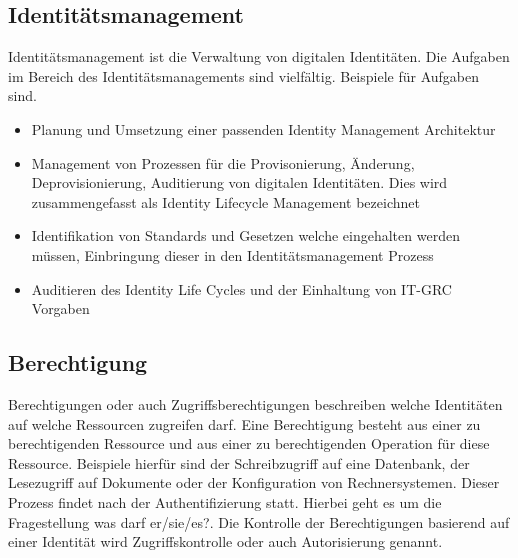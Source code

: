 \documentclass[11pt]{article}
\begin{document}
\subsection{Identitätsmanagement}
Identitätsmanagement ist die Verwaltung von digitalen Identitäten. Die Aufgaben im Bereich des Identitätsmanagements sind vielfältig. Beispiele für Aufgaben sind.
\begin{itemize}
  \item Planung und Umsetzung einer passenden Identity Management Architektur~\cite{windley2005digital}
  \item Management von Prozessen für die Provisonierung, Änderung, Deprovisionierung, Auditierung von digitalen Identitäten. Dies wird zusammengefasst als Identity Lifecycle Management bezeichnet~\cite{sharma2016identity}
  \item Identifikation von Standards und Gesetzen welche eingehalten werden müssen, Einbringung dieser in den Identitätsmanagement Prozess~\cite{azhar2014economics}
  \item Auditieren des Identity Life Cycles und der Einhaltung von IT-GRC Vorgaben~\cite{peyton2007audit}~\cite{accorsi2008automated}
\end{itemize}
\subsection{Berechtigung}
Berechtigungen oder auch Zugriffsberechtigungen beschreiben welche Identitäten auf welche Ressourcen zugreifen darf. Eine Berechtigung besteht aus einer zu berechtigenden Ressource und aus einer zu berechtigenden Operation für diese Ressource. Beispiele hierfür sind der Schreibzugriff auf eine Datenbank, der Lesezugriff auf Dokumente oder der Konfiguration von Rechnersystemen. Dieser Prozess findet nach der Authentifizierung statt. Hierbei geht es um die Fragestellung \glqq{}was darf er/sie/es?\grqq{}. Die Kontrolle der Berechtigungen basierend auf einer Identität wird Zugriffskontrolle oder auch Autorisierung genannt.~\cite{tsolkas2017}
\end{document}
